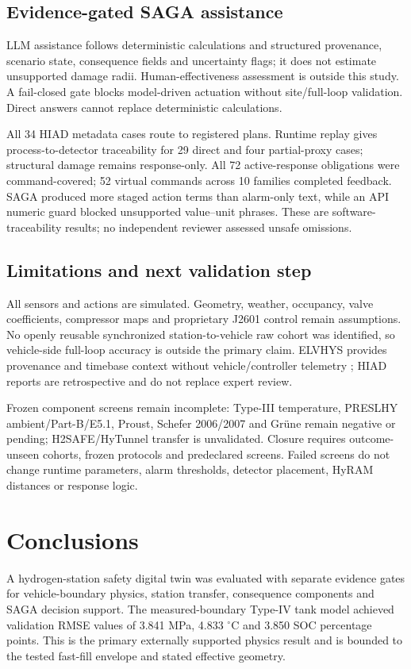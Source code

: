 \documentclass[12pt,a4paper]{article}
\begin{document}
\subsection{Evidence-gated SAGA assistance}
LLM assistance follows deterministic calculations and structured provenance,
scenario state, consequence fields and uncertainty flags; it does not estimate
unsupported damage radii. Human-effectiveness assessment is outside this study.
A fail-closed gate blocks model-driven actuation without site/full-loop
validation. Direct answers cannot replace deterministic calculations.

All 34 HIAD metadata cases route to registered plans. Runtime replay gives
process-to-detector traceability for 29 direct and four partial-proxy cases;
structural damage remains response-only. All 72 active-response obligations were
command-covered; 52 virtual commands across 10 families completed feedback. SAGA produced
more staged action terms than alarm-only text, while an API numeric guard blocked
unsupported value--unit phrases. These are software-traceability results; no
independent reviewer assessed unsafe omissions.

\subsection{Limitations and next validation step}
All sensors and actions are simulated. Geometry, weather, occupancy, valve
coefficients, compressor maps and proprietary J2601 control remain assumptions.
No openly reusable synchronized station-to-vehicle raw cohort was identified, so
vehicle-side full-loop accuracy is outside the primary claim. ELVHYS provides
provenance and timebase context without vehicle/controller telemetry
\cite{elvhys2025}; HIAD reports are retrospective and do not replace expert
review.

Frozen component screens remain incomplete: Type-III temperature, PRESLHY
ambient/Part-B/E5.1, Proust, Schefer 2006/2007 and Grüne remain negative or pending;
H2SAFE/HyTunnel transfer is unvalidated. Closure requires outcome-unseen cohorts,
frozen protocols and predeclared screens. Failed screens do not change runtime
parameters, alarm thresholds, detector placement, HyRAM distances or response logic.

\section{Conclusions}
A hydrogen-station safety digital twin was evaluated with separate evidence gates
for vehicle-boundary physics, station transfer, consequence components and SAGA
decision support. The measured-boundary Type-IV tank model achieved validation
RMSE values of 3.841 MPa, 4.833 $^{\circ}$C and 3.850 SOC percentage points.
This is the primary externally supported physics result and is bounded to the
tested fast-fill envelope and stated effective geometry.
\end{document}
